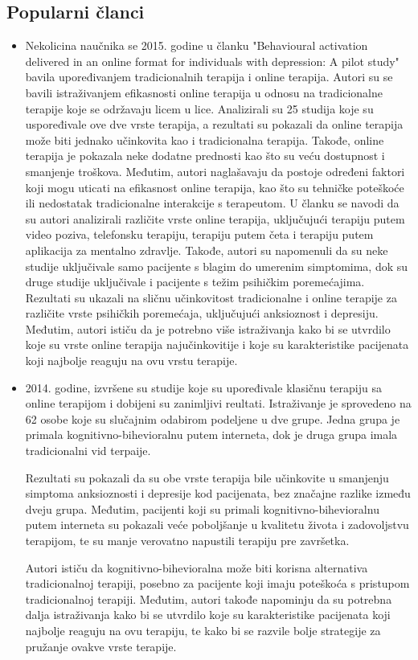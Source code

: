 \documentclass[a4paper]{article}
\begin{document}
\subsection{Popularni članci}
\begin{itemize}
\item Nekolicina naučnika se 2015. godine u članku "Behavioural activation delivered in an online format for individuals with depression: A pilot study" \cite{peta} bavila upoređivanjem tradicionalnih terapija i online terapija. Autori su se bavili istraživanjem efikasnosti online terapija u odnosu na tradicionalne terapije koje se održavaju licem u lice. Analizirali su 25 studija koje su uspoređivale ove dve vrste terapija, a rezultati su pokazali da online terapija može biti jednako učinkovita kao i tradicionalna terapija. Takođe, online terapija je pokazala neke dodatne prednosti kao što su veću dostupnost i smanjenje troškova. Međutim, autori naglašavaju da postoje određeni faktori koji mogu uticati na efikasnost online terapija, kao što su tehničke poteškoće ili nedostatak tradicionalne interakcije s terapeutom. U članku se navodi da su autori analizirali različite vrste online terapija, uključujući terapiju putem video poziva, telefonsku terapiju, terapiju putem četa i terapiju putem aplikacija za mentalno zdravlje. Takođe, autori su napomenuli da su neke studije uključivale samo pacijente s blagim do umerenim simptomima, dok su druge studije uključivale i pacijente s težim psihičkim poremećajima. Rezultati su ukazali na sličnu učinkovitost tradicionalne i online terapije za različite vrste psihičkih poremećaja, uključujući anksioznost i depresiju. Međutim, autori ističu da je potrebno više istraživanja kako bi se utvrdilo koje su vrste online terapija najučinkovitije i koje su karakteristike pacijenata koji najbolje reaguju na ovu vrstu terapije.

\item 2014. godine, izvršene su studije koje su upoređivale klasičnu terapiju sa online terapijom i dobijeni su zanimljivi reultati. Istraživanje je sprovedeno na 62 osobe koje su slučajnim odabirom podeljene u dve grupe. Jedna grupa je primala kognitivno-bihevioralnu putem interneta, dok je druga grupa imala tradicionalni vid terpaije.

Rezultati su pokazali da su obe vrste terapija bile učinkovite u smanjenju simptoma anksioznosti i depresije kod pacijenata, bez značajne razlike između dveju grupa. Međutim, pacijenti koji su primali kognitivno-bihevioralnu putem interneta su pokazali veće poboljšanje u kvalitetu života i zadovoljstvu terapijom, te su manje verovatno napustili terapiju pre završetka.

Autori ističu da kognitivno-bihevioralna može biti korisna alternativa tradicionalnoj terapiji, posebno za pacijente koji imaju poteškoća s pristupom tradicionalnoj terapiji. Međutim, autori takođe napominju da su potrebna dalja istraživanja kako bi se utvrdilo koje su karakteristike pacijenata koji najbolje reaguju na ovu terapiju, te kako bi se razvile bolje strategije za pružanje ovakve vrste terapije.
\end{itemize}
\end{document}
